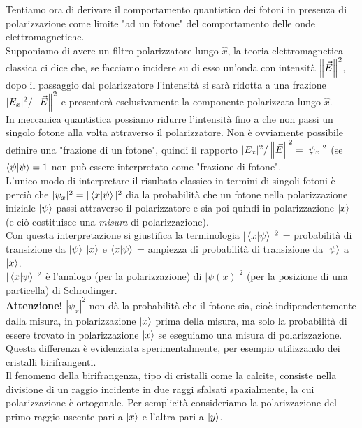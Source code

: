 \documentclass[FisicaTeorica.tex]{subfiles}
\begin{document}
Tentiamo ora di derivare il comportamento quantistico dei fotoni in presenza di polarizzazione come limite "ad un fotone" del comportamento delle onde elettromagnetiche.\\
Supponiamo di avere un filtro polarizzatore lungo $\hat{x}$, la teoria elettromagnetica classica ci dice che, se facciamo incidere su di esso un'onda con intensità $\left\lVert\vec{E}\right\rVert^2$, dopo il passaggio dal polarizzatore l'intensità si sarà ridotta a una frazione $|E_x|^2/\left\lVert\vec{E}\right\rVert^2$ 
e presenterà esclusivamente la componente polarizzata lungo $\hat{x}$.\\
In meccanica quantistica possiamo ridurre l'intensità fino a che non passi un singolo fotone alla volta attraverso il polarizzatore. Non è ovviamente possibile definire una "frazione di un fotone", quindi il rapporto $|E_x|^2/\left\lVert\vec{E}\right\rVert^2 = |\psi_x|^2$ (se $\braket{\psi|\psi} = 1$ non può essere interpretato come "frazione di fotone".\\
L'unico modo di interpretare il risultato classico in termini di singoli fotoni è perciò che $|\psi_x|^2 = |\braket{x|\psi}|^2$ dia la probabilità che un fotone nella polarizzazione iniziale $\ket{\psi}$ passi attraverso il polarizzatore e sia poi quindi in polarizzazione $\ket{x}$ (e ciò costituisce una \textit{misura} di polarizzazione).\\
Con questa interpretazione si giustifica la terminologia $|\braket{x|\psi}|^2$ = probabilità di transizione da $\ket{\psi}$ $\ket{x}$ e $\braket{x|\psi}$ = ampiezza di probabilità di transizione da $\ket{\psi}$ a $\ket{x}$.\\
$|\braket{x|\psi}|^2$ è l'analogo (per la polarizzazione) di $|\psi(x)|^2$ (per la posizione di una particella) di Schrodinger.\\
\textbf{Attenzione!} $|\psi_x|^2$ non dà la probabilità che il fotone sia, cioè indipendentemente dalla misura, in polarizzazione $\ket{x}$ prima della misura, ma solo la probabilità di essere trovato in polarizzazione $\ket{x}$ se eseguiamo una misura di  polarizzazione.\\ 
Questa differenza è evidenziata sperimentalmente, per esempio utilizzando dei cristalli birifrangenti.\\
Il fenomeno della birifrangenza, tipo di cristalli come la calcite, consiste nella divisione di un raggio incidente in due raggi sfalsati spazialmente, la cui polarizzazione è ortogonale. Per semplicità consideriamo la polarizzazione del primo raggio uscente pari a $\ket{x}$ e l'altra pari a $\ket{y}$.\\
\end{document}
